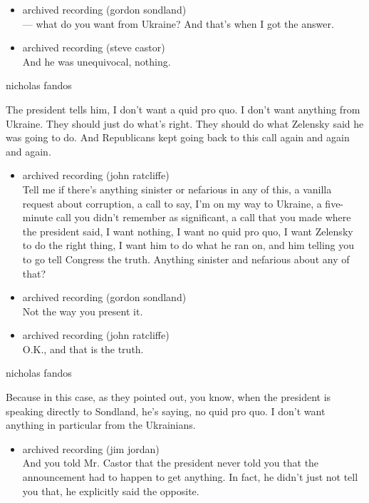\begin{itemize}
\item
  archived recording (gordon sondland)\\
  --- what do you want from Ukraine? And that's when I got the answer.
\item
  archived recording (steve castor)\\
  And he was unequivocal, nothing.
\end{itemize}

nicholas fandos

The president tells him, I don't want a quid pro quo. I don't want
anything from Ukraine. They should just do what's right. They should do
what Zelensky said he was going to do. And Republicans kept going back
to this call again and again and again.

\begin{itemize}
\item
  archived recording (john ratcliffe)\\
  Tell me if there's anything sinister or nefarious in any of this, a
  vanilla request about corruption, a call to say, I'm on my way to
  Ukraine, a five-minute call you didn't remember as significant, a call
  that you made where the president said, I want nothing, I want no quid
  pro quo, I want Zelensky to do the right thing, I want him to do what
  he ran on, and him telling you to go tell Congress the truth. Anything
  sinister and nefarious about any of that?
\item
  archived recording (gordon sondland)\\
  Not the way you present it.
\item
  archived recording (john ratcliffe)\\
  O.K., and that is the truth.
\end{itemize}

nicholas fandos

Because in this case, as they pointed out, you know, when the president
is speaking directly to Sondland, he's saying, no quid pro quo. I don't
want anything in particular from the Ukrainians.

\begin{itemize}
\tightlist
\item
  archived recording (jim jordan)\\
  And you told Mr. Castor that the president never told you that the
  announcement had to happen to get anything. In fact, he didn't just
  not tell you that, he explicitly said the opposite.
\end{itemize}

